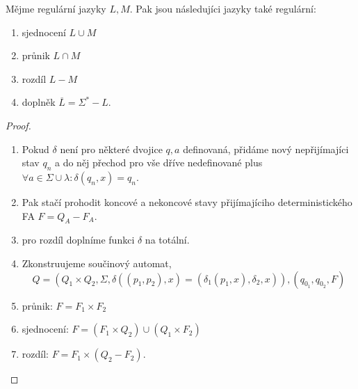 \documentclass[../main.tex]{subfiles}
\begin{document}
\begin{theorem}
    Mějme regulární jazyky $L,M$. Pak jsou následujíci jazyky také regulární:
    \begin{enumerate}
        \item sjednocení $L\cup M$
        \item průnik $L \cap M$
        \item rozdíl $L - M$
        \item doplněk $\overline{L} = \Sigma^* - L$.
    \end{enumerate} 
\end{theorem}
\begin{proof}
    \begin{enumerate}
        \item Pokud $\delta$ není pro některé dvojice $q,a$ definovaná, přidáme nový nepřijímajíci stav $q_n$ a do něj
        přechod pro vše dříve nedefinované plus $\forall a \in \Sigma \cup {\lambda}: \delta(q_n,x) = q_n$.
        \item Pak stačí prohodit koncové a nekoncové stavy přijímajíciho deterministického FA $F = Q_A - F_A$.
        \item pro rozdíl doplníme funkci $\delta$ na totální.
        \item Zkonstruujeme součinový automat,
        \[Q = (Q_1 \times Q_2, \Sigma, \delta((p_1,p_2),x) = (\delta_1(p_1,x),\delta_2,x)), (q_{0_1},q_{0_2},F) \]
        \item průnik: $F = F_1 \times F_2$
        \item sjednocení: $F = (F_1 \times Q_2) \cup (Q_1 \times F_2)$
        \item rozdíl: $F = F_1 \times (Q_2 - F_2)$. 
    \end{enumerate}
\end{proof}
\end{document}
